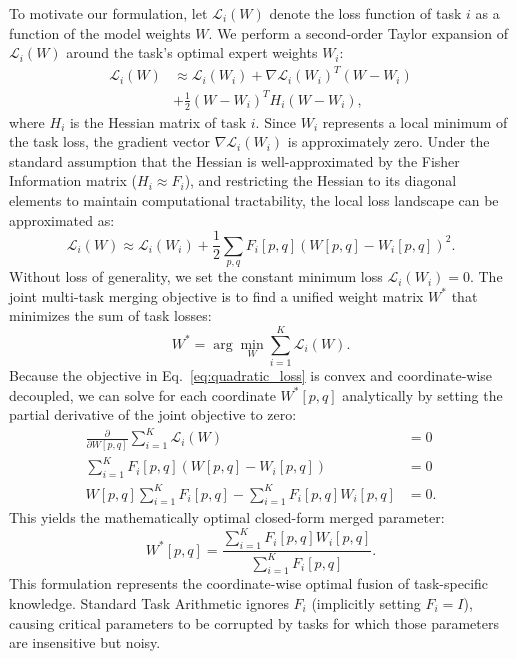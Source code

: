 \documentclass{article}
\theoremstyle{plain}
\theoremstyle{definition}
\theoremstyle{remark}
\begin{document}
To motivate our formulation, let $\mathcal{L}_i(W)$ denote the loss function of task $i$ as a function of the model weights $W$. We perform a second-order Taylor expansion of $\mathcal{L}_i(W)$ around the task's optimal expert weights $W_i$:
\begin{align}
\mathcal{L}_i(W) &\approx \mathcal{L}_i(W_i) + \nabla \mathcal{L}_i(W_i)^T (W - W_i) \nonumber \\
&+ \frac{1}{2} (W - W_i)^T H_i (W - W_i),
\end{align}
where $H_i$ is the Hessian matrix of task $i$. Since $W_i$ represents a local minimum of the task loss, the gradient vector $\nabla \mathcal{L}_i(W_i)$ is approximately zero. Under the standard assumption that the Hessian is well-approximated by the Fisher Information matrix ($H_i \approx F_i$), and restricting the Hessian to its diagonal elements to maintain computational tractability, the local loss landscape can be approximated as:
\begin{equation}
\label{eq:quadratic_loss}
\mathcal{L}_i(W) \approx \mathcal{L}_i(W_i) + \frac{1}{2} \sum_{p,q} F_i[p,q] \left( W[p,q] - W_i[p,q] \right)^2.
\end{equation}
Without loss of generality, we set the constant minimum loss $\mathcal{L}_i(W_i) = 0$. The joint multi-task merging objective is to find a unified weight matrix $W^*$ that minimizes the sum of task losses:
\begin{equation}
W^* = \arg \min_W \sum_{i=1}^K \mathcal{L}_i(W).
\end{equation}
Because the objective in Eq.~\eqref{eq:quadratic_loss} is convex and coordinate-wise decoupled, we can solve for each coordinate $W^*[p,q]$ analytically by setting the partial derivative of the joint objective to zero:
\begin{align}
\frac{\partial}{\partial W[p,q]} \sum_{i=1}^K \mathcal{L}_i(W) &= 0 \nonumber \\
\sum_{i=1}^K F_i[p,q] \left( W[p,q] - W_i[p,q] \right) &= 0 \nonumber \\
W[p,q] \sum_{i=1}^K F_i[p,q] - \sum_{i=1}^K F_i[p,q] W_i[p,q] &= 0.
\end{align}
This yields the mathematically optimal closed-form merged parameter:
\begin{equation}
\label{eq:fw_ta_opt}
W^*[p,q] = \frac{\sum_{i=1}^K F_i[p,q] W_i[p,q]}{\sum_{i=1}^K F_i[p,q]}.
\end{equation}
This formulation represents the coordinate-wise optimal fusion of task-specific knowledge. Standard Task Arithmetic ignores $F_i$ (implicitly setting $F_i = I$), causing critical parameters to be corrupted by tasks for which those parameters are insensitive but noisy.
\end{document}
